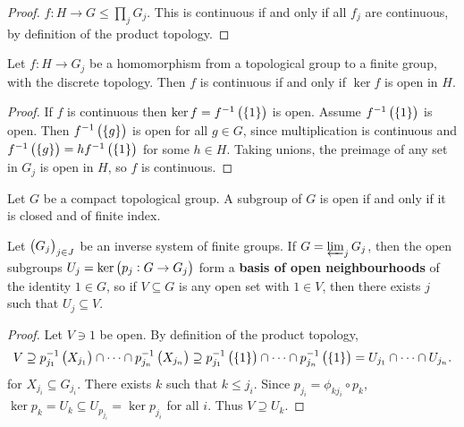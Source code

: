 \begin{proof}
$ f : H \to G \le \prod_j G_j $. This is continuous if and only if all $ f_j $ are continuous, by definition of the product topology.
\end{proof}

\pagebreak

\begin{proposition}
Let $ f : H \to G_j $ be a homomorphism from a topological group to a finite group, with the discrete topology. Then $ f $ is continuous if and only if $ \ker f $ is open in $ H $.
\end{proposition}

\begin{proof}
If $ f $ is continuous then $ \ker f = f^{-1}\br{\cbr{1}} $ is open. Assume $ f^{-1}\br{\cbr{1}} $ is open. Then $ f^{-1}\br{\cbr{g}} $ is open for all $ g \in G $, since multiplication is continuous and $ f^{-1}\br{\cbr{g}} = hf^{-1}\br{\cbr{1}} $ for some $ h \in H $. Taking unions, the preimage of any set in $ G_j $ is open in $ H $, so $ f $ is continuous.
\end{proof}

\begin{proposition}
Let $ G $ be a compact topological group. A subgroup of $ G $ is open if and only if it is closed and of finite index.
\end{proposition}

\begin{proposition}
\label{prop:1.2.28}
Let $ \br{G_j}_{j \in J} $ be an inverse system of finite groups. If $ G = \varprojlim_j G_j $, then the open subgroups $ U_j = \ker \br{p_j : G \to G_j} $ form a \textbf{basis of open neighbourhoods} of the identity $ 1 \in G $, so if $ V \subseteq G $ is any open set with $ 1 \in V $, then there exists $ j $ such that $ U_j \subseteq V $.
\end{proposition}

\begin{proof}
Let $ V \ni 1 $ be open. By definition of the product topology,
$$ V \supseteq p_{j_1}^{-1}\br{X_{j_1}} \cap \dots \cap p_{j_n}^{-1}\br{X_{j_n}} \supseteq p_{j_1}^{-1}\br{\cbr{1}} \cap \dots \cap p_{j_n}^{-1}\br{\cbr{1}} = U_{j_1} \cap \dots \cap U_{j_n}. $$
for $ X_{j_i} \subseteq G_{j_i} $. There exists $ k $ such that $ k \le j_i $. Since $ p_{j_i} = \phi_{kj_i} \circ p_k $, $ \ker p_k = U_k \subseteq U_{p_{j_i}} = \ker p_{j_i} $ for all $ i $. Thus $ V \supseteq U_k $.
\end{proof}

